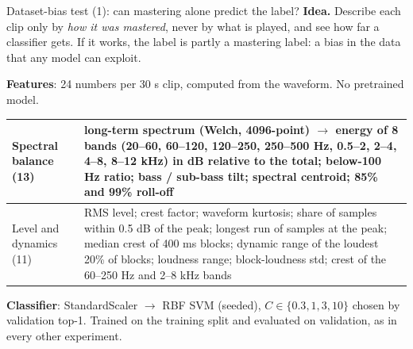 \documentclass[aspectratio=169,11pt]{beamer}
\begin{document}
\begin{frame}[t]{Dataset-bias test (1): can mastering alone predict the label?}
  \small
  \textbf{Idea.} Describe each clip only by \emph{how it was mastered}, never by what is played, and see how far a classifier gets.
  If it works, the label is partly a mastering label: a bias in the data that any model can exploit.
  \vspace{0.6em}

  \textbf{Features}: 24 numbers per 30 s clip, computed from the waveform. No pretrained model.
  \vspace{0.2em}

  {\footnotesize
  \begin{tabular}{@{}>{\raggedright\arraybackslash}p{}>{\raggedright\arraybackslash}p{}@{}}
    \toprule
    Spectral balance (13) & long-term spectrum (Welch, 4096-point) $\rightarrow$ energy of 8 bands (20--60, 60--120, 120--250, 250--500 Hz, 0.5--2, 2--4, 4--8, 8--12 kHz) in dB relative to the total; below-100 Hz ratio; bass / sub-bass tilt; spectral centroid; 85\% and 99\% roll-off \\ \midrule
    Level and dynamics (11) & RMS level; crest factor; waveform kurtosis; share of samples within 0.5 dB of the peak; longest run of samples at the peak; median crest of 400 ms blocks; dynamic range of the loudest 20\% of blocks; loudness range; block-loudness std; crest of the 60--250 Hz and 2--8 kHz bands \\
    \bottomrule
  \end{tabular}}
  \vspace{0.7em}

  \textbf{Classifier}: StandardScaler $\rightarrow$ RBF SVM (seeded), $C \in \{0.3, 1, 3, 10\}$ chosen by validation top-1.
  Trained on the training split and evaluated on validation, as in every other experiment.
\end{frame}
\end{document}
